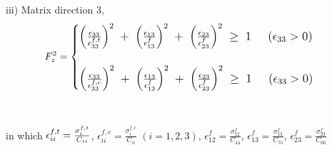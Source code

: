 \documentclass[a4paper,12pt]{extarticle}
\begin{document}
\\
\\
iii) Matrix direction 3,
\\
\begin{equation}
\large{F_{z}^{2} =  
	\begin{cases}

	\Big(\frac{\epsilon_{33}}{\epsilon_{33}^{f,t}}\Big)^{2} \; + \; \Big(\frac{\epsilon_{13}}{\epsilon_{13}^{f}}\Big)^{2} \; + \; \Big(\frac{\epsilon_{23}}{\epsilon_{23}^{f}}\Big)^{2} \; \geq  \; 1 \; \; \; \; \;  (\epsilon_{33}  >  0) \\

\\
	\Big(\frac{\epsilon_{33}}{\epsilon_{33}^{f,c}}\Big)^{2} \; + \; \Big(\frac{\epsilon_{13}}{\epsilon_{13}^{f}}\Big)^{2} \; + \; \Big(\frac{\epsilon_{23}}{\epsilon_{23}^{f}}\Big)^{2} \; \geq  \; 1 \; \; \; \; \;  (\epsilon_{33}  >  0) \\



	\end{cases}}
\end{equation}
\\
\\
in which  $\LARGE{\epsilon_{ii}^{f,t}=\frac{\sigma_{i}^{f,t}}{C_{ii}}}$,  $\epsilon_{ii}^{f,c}  =   \frac{\sigma_{i}^{f,c}}{C_{ii}} \; (i = 1,2,3)$,  $\epsilon_{12}^{f}  =   \frac{\sigma_{12}^{f}}{C_{44}}$,   $\epsilon_{13}^{f}  =  \frac{\sigma_{13}^{f}}{C_{55}}$,  $\epsilon_{23}^{f}  =   \frac{\sigma_{23}^{f}}{C_{66}}$
\end{document}
